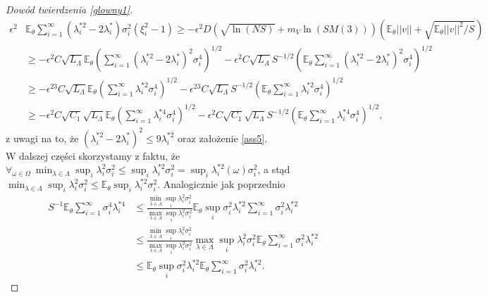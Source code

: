 \documentclass[man,mfiu]{mgrwms}
\begin{document}
\begin{proof}[Dowód twierdzenia \ref{glowny1}]
\begin{displaymath}
\begin{split}
\epsilon^2&\mathbb{E}_{\theta}\sum_{i=1}^{\infty}(\lambda_i^{*2}-2\lambda_i^*)\sigma_i^2(\xi_i^2-1)\geq  -\epsilon^2D\left(\sqrt{\ln (NS)}+m_V\ln (SM(3))\right)\left(\mathbb{E}_{\theta}||v||+\sqrt{\mathbb{E}_{\theta}||v||^2/S}\right)\\
&\geq -\epsilon^2C\sqrt{L_{\Lambda}}\mathbb{E}_{\theta}\left(\sum_{i=1}^{\infty}(\lambda_i^{*2}-2\lambda_i^*)^2\sigma_i^4\right)^{1/2}-\epsilon^2C\sqrt{L_{\Lambda}}S^{-1/2}\left(\mathbb{E}_{\theta}\sum_{i=1}^{\infty}(\lambda_i^{*2}-2\lambda_i^*)^2\sigma_i^4\right)^{1/2}\\
&\geq -\epsilon^23C\sqrt{L_{\Lambda}}\mathbb{E}_{\theta}\left(\sum_{i=1}^{\infty}\lambda_i^{*2}\sigma_i^4\right)^{1/2}-\epsilon^23C\sqrt{L_{\Lambda}}S^{-1/2}\left(\mathbb{E}_{\theta}\sum_{i=1}^{\infty}\lambda_i^{*2}\sigma_i^4\right)^{1/2}\\
&\geq -\epsilon^2C\sqrt{C_1}\sqrt{L_{\Lambda}}\mathbb{E}_{\theta}\left(\sum_{i=1}^{\infty}\lambda_i^{*4}\sigma_i^4\right)^{1/2}-\epsilon^2C\sqrt{C_1}\sqrt{L_{\Lambda}}S^{-1/2}\left(\mathbb{E}_{\theta}\sum_{i=1}^{\infty}\lambda_i^{*4}\sigma_i^4\right)^{1/2},
\end{split}
\end{displaymath}
z uwagi na to, że $(\lambda_i^{*2}-2\lambda_i^*)^2\leq 9\lambda_i^{*2}$ oraz założenie \ref{ass5}.\\
\indent W dalszej części skorzystamy z faktu, że $\forall_{\omega\in \Omega}\ \min_{\lambda\in \Lambda}\sup_i \lambda_i^2\sigma_i^2\leq \sup_i\lambda_i^{*2}\sigma_i^2=\sup_i\lambda_i^{*2}(\omega)\sigma_i^2$, a stąd $\min_{\lambda\in \Lambda}\sup_i \lambda_i^2\sigma_i^2\leq \mathbb{E}_{\theta}\sup_i\lambda_i^{*2}\sigma_i^2$. Analogicznie jak poprzednio
\begin{displaymath}
\begin{split}
S^{-1}\mathbb{E}_{\theta}\sum_{i=1}^{\infty}\sigma_i^4\lambda_i^{*4}&\leq \frac{\min_{\lambda\in \Lambda}\sup_i \lambda_i^2\sigma_i^2}{\max_{\lambda\in \Lambda}\sup_i \lambda_i^2\sigma_i^2}\mathbb{E}_{\theta}\sup_i\sigma_i^2\lambda_i^{*2}\sum_{i=1}^{\infty}\sigma_i^2\lambda_i^{*2}\\
&\leq \frac{\min_{\lambda\in \Lambda}\sup_i \lambda_i^2\sigma_i^2}{\max_{\lambda\in \Lambda}\sup_i \lambda_i^2\sigma_i^2}\max_{\lambda\in \Lambda}\sup_i \lambda_i^2\sigma_i^2\mathbb{E}_{\theta}\sum_{i=1}^{\infty}\sigma_i^2\lambda_i^{*2}\\
&\leq \mathbb{E}_{\theta}\sup_i\sigma_i^2\lambda_i^{*2}\mathbb{E}_{\theta}\sum_{i=1}^{\infty}\sigma_i^2\lambda_i^{*2}.

\end{split}
\end{displaymath}
\end{proof}
\end{document}
